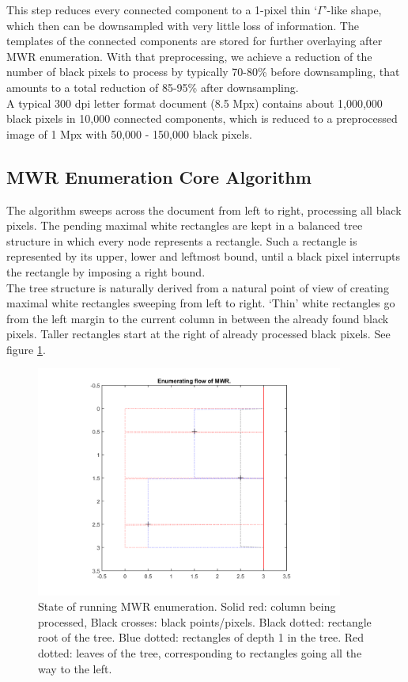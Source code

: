 \documentclass{report}
\begin{document}
This step reduces every connected component to a 1-pixel thin `$\Gamma$'-like shape, which then can be downsampled with very little loss of
information.
The templates of the connected components are stored for further overlaying after MWR enumeration. With that preprocessing, we achieve a
reduction of the number of black pixels to process by typically 70-80\% before downsampling, that amounts to a total reduction of 85-95\% after
downsampling.\\

A typical 300 dpi letter format document (8.5 Mpx) contains about 1,000,000 black pixels in 10,000 connected components, which is
reduced to a preprocessed image of 1 Mpx with 50,000 - 150,000 black pixels.

\subsection{MWR Enumeration Core Algorithm}

The algorithm sweeps across the document from left to right, processing all black pixels. The pending maximal white rectangles are kept in a
balanced tree structure in which every node represents a rectangle. Such a rectangle is represented by its upper, lower and leftmost bound, until
a black pixel interrupts the rectangle by imposing a right bound.\\

The tree structure is naturally derived from a natural point of view of creating maximal white rectangles sweeping from left to right.
`Thin' white rectangles go from the left margin to the current column in between the already found black pixels. Taller rectangles start at the
right of already processed black pixels. See figure \ref{rectangles}.

\begin{figure}
\centering
\includegraphics[width = 0.9\textwidth]{rectflow.png}
\caption{State of running MWR enumeration. Solid red: column being processed, Black crosses: black points/pixels. Black dotted: rectangle root of
the tree. Blue dotted: rectangles of depth 1 in the tree. Red dotted: leaves of the tree, corresponding to rectangles going all the way to the
left.}
\label{rectangles}
\end{figure}
\end{document}
